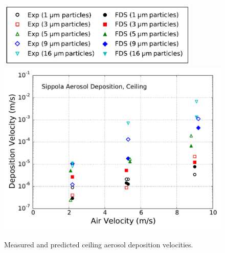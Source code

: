 \begin{figure}[p]
\includegraphics[width=3.8in]{Fig_Sippola_Aerosol_Deposition_Legend.pdf} \\
\includegraphics[width=5.0in]{Fig_Sippola_Aerosol_Ceiling_Deposition.pdf}
\caption[Ceiling aerosol deposition velocities]
{Measured and predicted ceiling aerosol deposition velocities.}
\label{fig:Sippola_Aerosol_Deposition_Velocity_1}
\end{figure}

